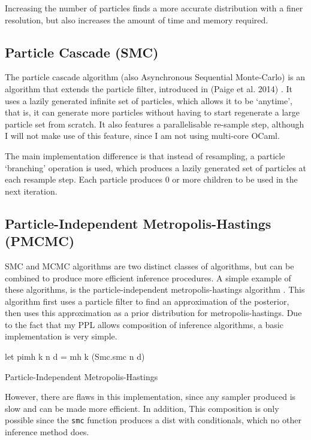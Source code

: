 Increasing the number of particles finds a more accurate distribution with a finer resolution, but also increases the amount of time and memory required.
	
\subsection{Particle Cascade (SMC)} \label{sec:pc}
The particle cascade algorithm (also Asynchronous Sequential Monte-Carlo) is an algorithm that extends the particle filter, introduced in (Paige et al. 2014) \cite{paige2014asynchronous}. It uses a lazily generated infinite set of particles, which allows it to be `anytime', that is, it can generate more particles without having to start regenerate a large particle set from scratch. It also features a parallelisable re-sample step, although I will not make use of this feature, since I am not using multi-core OCaml.
	
The main implementation difference is that instead of resampling, a particle `branching' operation is used, which produces a lazily generated set of particles at each resample step. Each particle produces 0 or more children to be used in the next iteration.
	
\subsection{Particle-Independent Metropolis-Hastings (PMCMC)} \label{sec:pimh}
	
SMC and MCMC algorithms are two distinct classes of algorithms, but can be combined to produce more efficient inference procedures. A simple example of these algorithms, is the particle-independent metropolis-hastings algorithm \cite{pmcmc}. This algorithm first uses a particle filter to find an approximation of the posterior, then uses this approximation as a prior distribution for metropolis-hastings.
Due to the fact that my PPL allows composition of inference algorithms, a basic implementation is very simple.
	
\begin{listing}
\begin{ocamlcode-in}
let pimh k n d = mh k (Smc.smc n d)
\end{ocamlcode-in}
\caption{Particle-Independent Metropolis-Hastings}
\end{listing}
However, there are flaws in this implementation, since any sampler produced is slow and can be made more efficient. In addition, This composition is only possible since the \texttt{smc} function produces a dist with conditionals, which no other inference method does.

